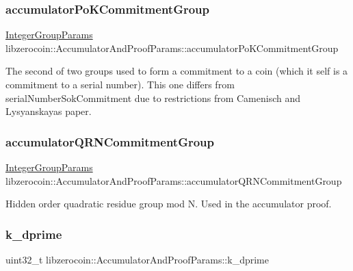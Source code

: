\subsubsection{\texorpdfstring{accumulator\+Po\+K\+Commitment\+Group}{accumulatorPoKCommitmentGroup}}
{\footnotesize\ttfamily \mbox{\hyperlink{classlibzerocoin_1_1_integer_group_params}{Integer\+Group\+Params}} libzerocoin\+::\+Accumulator\+And\+Proof\+Params\+::accumulator\+Po\+K\+Commitment\+Group}

The second of two groups used to form a commitment to a coin (which it self is a commitment to a serial number). This one differs from serial\+Number\+Sok\+Commitment due to restrictions from Camenisch and Lysyanskaya\textquotesingle{}s paper. \mbox{\label{classlibzerocoin_1_1_accumulator_and_proof_params_ab786dbc4efdd8950e5c2591c0bf6de8c}} 
\subsubsection{\texorpdfstring{accumulator\+Q\+R\+N\+Commitment\+Group}{accumulatorQRNCommitmentGroup}}
{\footnotesize\ttfamily \mbox{\hyperlink{classlibzerocoin_1_1_integer_group_params}{Integer\+Group\+Params}} libzerocoin\+::\+Accumulator\+And\+Proof\+Params\+::accumulator\+Q\+R\+N\+Commitment\+Group}

Hidden order quadratic residue group mod N. Used in the accumulator proof. \mbox{\label{classlibzerocoin_1_1_accumulator_and_proof_params_a9030b909ffef089f7fcffdccee6c2b2f}} 
\subsubsection{\texorpdfstring{k\+\_\+dprime}{k\_dprime}}
{\footnotesize\ttfamily uint32\+\_\+t libzerocoin\+::\+Accumulator\+And\+Proof\+Params\+::k\+\_\+dprime}

